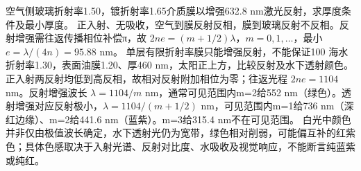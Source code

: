 \problemtext 空气侧玻璃折射率1.50，镀折射率1.65介质膜以增强632.8 nm激光反射，求厚度条件及最小厚度。
\workings 正入射、无吸收，空气到膜反射反相，膜到玻璃反射不反相。反射增强需往返传播相位补偿π，故 $2ne=(m+1/2)\lambda$，$m=0,1,\ldots$，最小 $e=\lambda/(4n)=95.88$ nm。
\crosscheck 单层有限折射率膜只能增强反射，不能保证100%
\problemtext 海水折射率1.30，表面油膜1.20、厚460 nm，太阳正上方，比较反射及水下透射颜色。
\workings 正入射两反射均低到高反相，故相对反射附加相位为零；往返光程 $2ne=1104$ nm。反射增强波长 $\lambda=1104/m$ nm，通常可见范围内m=2给552 nm（绿色）。透射增强对应反射极小，$\lambda=1104/(m+1/2)$ nm，可见范围内m=1给736 nm（深红边缘）、m=2给441.6 nm（蓝紫）。m=3给315.4 nm不在可见范围。
\crosscheck 白光中颜色并非仅由极值波长确定，水下透射光仍为宽带，绿色相对削弱，可能偏互补的红紫色；具体色感取决于入射光谱、反射对比度、水吸收及视觉响应，不能断言纯蓝紫或纯红。

